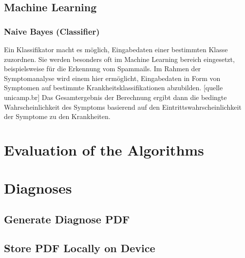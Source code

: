 \subsection{Machine Learning}
\subsubsection{Naive Bayes (Classifier)}
Ein Klassifikator macht es möglich, Eingabedaten einer bestimmten Klasse zuzordnen. Sie werden besonders oft im Machine Learning bereich eingesetzt, beispielsweise für die Erkennung vom Spammails. Im Rahmen der Symptomanalyse wird einem hier ermöglicht, Eingabedaten in Form von Symptomen auf bestimmte Krankheitsklassifikationen abzubilden. [quelle unicamp.br] Das Gesamtergebnis der Berechnung ergibt dann die bedingte Wahrscheinlichkeit des Symptoms basierend auf den Eintrittswahrscheinlichkeit der Symptome zu den Krankheiten. 
\section{Evaluation of the Algorithms}
\section{Diagnoses}
\subsection{Generate Diagnose PDF}
\subsection{Store PDF Locally on Device}
